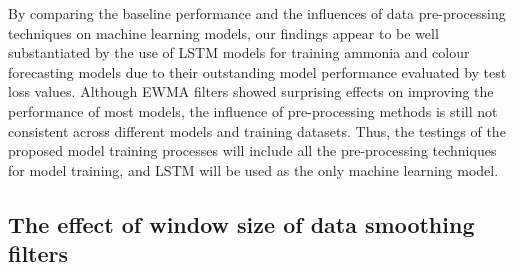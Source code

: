 By comparing the baseline performance and the influences of data pre-processing techniques on machine learning models, our findings appear to be well substantiated by the use of LSTM models for training ammonia and colour forecasting models due to their outstanding model performance evaluated by test loss values. Although EWMA filters showed surprising effects on improving the performance of most models, the influence of pre-processing methods is still not consistent across different models and training datasets. Thus, the testings of the proposed model training processes will include all the pre-processing techniques for model training, and LSTM will be used as the only machine learning model.

\subsection{The effect of window size of data smoothing filters}

